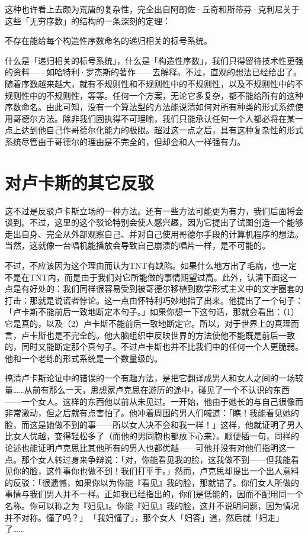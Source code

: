 \documentclass[
  12pt,
  twoside,
  openright,
  oldfontcommands,
]{memoir}
\begin{document}
这种也许看上去颇为荒唐的复杂性，完全出自阿朗佐·丘奇和斯蒂芬·克利尼关于这些「无穷序数」的结构的一条深刻的定理：

{不存在能给每个构造性序数命名的递归相关的标号系统。}

什么是「递归相关的标号系统」，什么是「构造性序数」，我们只得留待技术性更强的资料------如哈特利·罗杰斯的著作------去解释。不过，直观的想法已经给出了。随着序数越来越大，就有不规则性和不规则性中的不规则性，以及不规则性中的不规则性中的不规则性，等等。任何一个方案，无论它多复杂，都不能给所有的这种序数命名。由此可知，没有一个算法型的方法能说清如何对所有种类的形式系统使用哥德尔方法。除非我们固执得不可理喻，我们只能承认任何一个人都必将在某一点上达到他自己作哥德尔化能力的极限。超过这一点之后，具有这种复杂性的形式系统尽管由于哥德尔的理由是不完全的，但却会和人一样强有力。

\section{对卢卡斯的其它反驳}

这不过是反驳卢卡斯立场的一种方法。还有一些方法可能更为有力，我们后面将会谈到。不过，这里的这个驳论特别会使人感兴趣，因为它提出了试图创造一个能够走出自身、完全从外部观察自己、并对自己使用哥德尔手段的计算机程序的想法。当然，这就像一台唱机能播放会导致自己崩溃的唱片一样，是不可能的。

不过，不应该因为这个理由而认为TNT有缺陷。如果什么地方出了毛病，也一定不是在TNT内，而是由于我们对它所能做的事情期望过高。此外，认清下面这一点是有好处的：我们同样很容易受到被哥德尔移植到数学形式主义中的文字圈套的打击：那就是说谎者悖论。这一点由怀特利巧妙地指了出来。他提出了一个句子：「卢卡斯不能前后一致地断定本句子。」如果你想一下这句话，那就会看出：（1）它是真的，以及（2）卢卡斯不能前后一致地断定它。所以，对于世界上的真理而言，卢卡斯也是不完全的。他大脑组织中反映世界的方法使他不能既是前后一致的，同时又能断定那个真句子。不过卢卡斯也并不比我们中的任何一个人更脆弱。他和一个老练的形式系统是一个数量级的。

搞清卢卡斯论证中的错误的一个有趣方法，是把它翻译成男人和女人之间的一场较量\ldots\ldots 从前有那么一天，思想家卢克思在游历的途中，碰见了一个不认识的东西------一个女人。这样的东西他以前从未见过。一开始，他由于她长的与自己很像而非常激动，但之后就有点害怕了。他冲着周围的男人们喊道：「瞧！我能看见她的脸，而这是她做不到的事------所以女人决不会和我一样！」这样，他就证明了男人比女人优越，变得轻松多了（而他的男同胞也都放下心来）。顺便插一句，同样的论述也能证明卢克思比其他所有的男人也都优越------可他并没有对他们指明这一点。那个女人转过身来争辩说：「对，你能看见我的脸，这我做不到------但我能看见你的脸，这件事你也做不到！我们打平手。」然而，卢克思却提出一个出人意料的反驳：「很遗憾，如果你以为你能『看见』我的脸，那就错了。你们女人所做的事情与我们男人并不一样。正如我已经指出的，你们是低能的，因而不配用同一个名称。你可以称之为『妇见』。你能『妇见』我的脸，这并不说明问题，因为情况并不对称。懂了吗？」\,「我妇懂了」，那个女人「妇答」道，然后就「妇走」了\ldots\ldots{}
\end{document}
